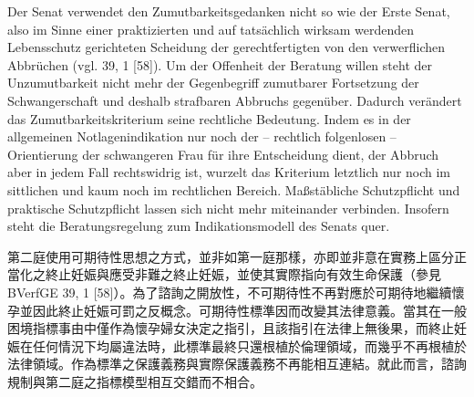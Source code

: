 \documentclass[12pt]{article}
\begin{document}
\begin{sourcepara}[title={原文SondervotumMS.289}]
Der Senat verwendet den Zumutbarkeitsgedanken nicht so wie der Erste Senat, also im Sinne einer praktizierten und auf tatsächlich wirksam werdenden Lebensschutz gerichteten Scheidung der gerechtfertigten von den verwerflichen Abbrüchen (vgl. \abbrBVerfGE{} 39, 1 [58]). Um der Offenheit der Beratung willen steht der Unzumutbarkeit nicht mehr der Gegenbegriff zumutbarer Fortsetzung der Schwangerschaft und deshalb strafbaren Abbruchs gegenüber. Dadurch verändert das Zumutbarkeitskriterium seine rechtliche Bedeutung. Indem es in der allgemeinen Notlagenindikation nur noch der -- rechtlich folgenlosen -- Orientierung der schwangeren Frau für ihre Entscheidung dient, der Abbruch aber in jedem Fall rechtswidrig ist, wurzelt das Kriterium letztlich nur noch im sittlichen und kaum noch im rechtlichen Bereich. Maßstäbliche Schutzpflicht und praktische Schutzpflicht lassen sich nicht mehr miteinander verbinden. Insofern steht die Beratungsregelung zum Indikationsmodell des Senats quer.
\end{sourcepara}
\begin{transpara}
第二庭使用可期待性思想之方式，並非如第一庭那樣，亦即並非意在實務上區分正當化之終止妊娠與應受非難之終止妊娠，並使其實際指向有效生命保護（參見 BVerfGE 39, 1 [58]）。為了諮詢之開放性，不可期待性不再對應於可期待地繼續懷孕並因此終止妊娠可罰之反概念。可期待性標準因而改變其法律意義。當其在一般困境指標事由中僅作為懷孕婦女決定之指引，且該指引在法律上無後果，而終止妊娠在任何情況下均屬違法時，此標準最終只還根植於倫理領域，而幾乎不再根植於法律領域。作為標準之保護義務與實際保護義務不再能相互連結。就此而言，諮詢規制與第二庭之指標模型相互交錯而不相合。
\end{transpara}
\end{document}
